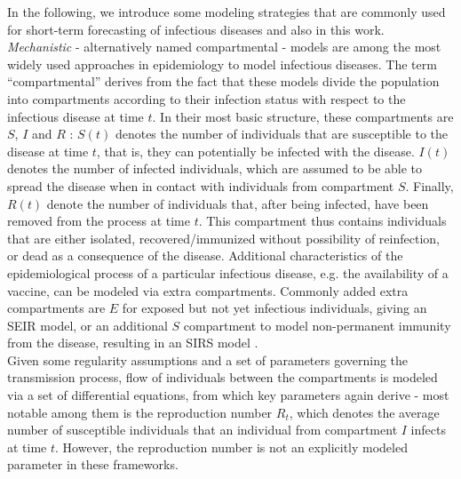 In the following, we introduce some modeling strategies that are commonly used for short-term forecasting of infectious diseases and also in this work.\\
\textit{Mechanistic} - alternatively named compartmental - models are among the most widely used approaches in epidemiology to model infectious diseases. The term ``compartmental'' derives from the fact that these models divide the population into compartments according to their infection status with respect to the infectious disease at time $t$. In their most basic structure, these compartments are $S$, $I$ and $R$ \citep{brauer_epidemic_2012}: $S(t)$ denotes the number of individuals that are susceptible to the disease at time $t$, that is, they can potentially be infected with the disease. $I(t)$ denotes the number of infected individuals, which are assumed to be able to spread the disease when in contact with individuals from compartment $S$. Finally, $R(t)$ denote the number of individuals that, after being infected, have been removed from the process at time $t$. This compartment thus contains individuals that are either isolated, recovered/immunized without possibility of reinfection, or dead as a consequence of the disease. Additional characteristics of the epidemiological process of a particular infectious disease, e.g. the availability of a vaccine, can be modeled via extra compartments. Commonly added extra compartments are $E$ for exposed but not yet infectious individuals, giving an SEIR model, or an additional $S$ compartment to model non-permanent immunity from the disease, resulting in an SIRS model \citep{brauer_epidemic_2012}. \\
Given some regularity assumptions and a set of parameters governing the transmission process, flow of individuals between the compartments is modeled via a set of differential equations, from which key parameters again derive - most notable among them is the reproduction number $R_t$, which denotes the average number of susceptible individuals that an individual from compartment $I$ infects at time $t$. However, the reproduction number is not an explicitly modeled parameter in these frameworks. \medskip\\
